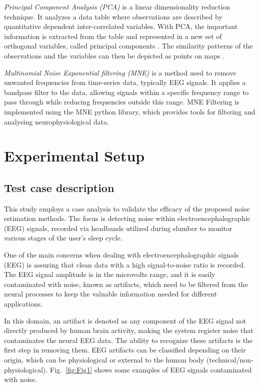 \documentclass[conference]{IEEEtran}
\begin{document}
\emph{Principal Component Analysis (PCA)} is a linear dimensionality
reduction technique. It analyzes a data table where observations are
described by quantitative dependent inter-correlated variables. With
PCA, the important information is extracted from the table and
represented in a new set of orthogonal variables, called principal
components \cite{bro2014principal}. The similarity patterns of the
observations and the variables can then be depicted as points on maps
\cite{abdi2010principal}.

\emph{Multinomial Noise Exponential filtering (MNE)} is a method used
to remove unwanted frequencies from time-series data, typically EEG
signals. It applies a bandpass filter to the data, allowing signals
within a specific frequency range to pass through while reducing
frequencies outside this range. MNE Filtering is implemented using the
MNE python library, which provides tools for filtering and analysing
neurophysiological data.




\section{Experimental Setup}
\label{sec:exp}


\subsection{Test case description}

This study employs a case analysis to validate the efficacy of the
proposed noise estimation methods. The focus is detecting noise within
electroencephalographic (EEG) signals, recorded via headbands utilized
during slumber to monitor various stages of the user's sleep cycle.


One of the main concerns when dealing with electroencephalographic signals (EEG) is assuring that clean data with a high signal-to-noise ratio is recorded. The EEG signal amplitude is in the microvolts range, and it is easily contaminated with noise, known as artifacts, which need to be filtered from the neural processes to keep the valuable information needed for different applications.

In this domain, an artifact is denoted as any component of the EEG signal not directly produced by human brain activity, making the system register noise that contaminates the neural EEG data. The ability to recognize these artifacts is the first step in removing them. EEG artifacts can be classified depending on their origin, which can be physiological or external to the human body (technical/non-physiological). Fig.~\ref{fig:Fig1} shows some examples of EEG signals contaminated with noise.
\end{document}

